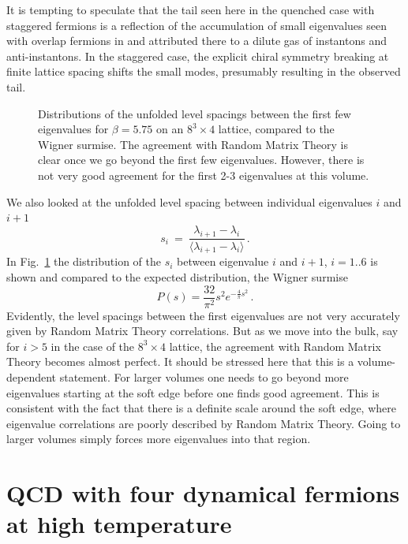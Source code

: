 \documentclass[11pt]{article}
\newcommand{\beq}{\begin{equation}}
\newcommand{\eeq}{\end{equation}}
\newcommand{\noi}{\vspace{12pt}\noindent}
\begin{document}
\noi
It is tempting to speculate that the tail seen here in the quenched case
with staggered fermions is a reflection of the accumulation of small
eigenvalues seen with overlap fermions in \cite{EHKN_fT} and attributed
there to a dilute gas of instantons and anti-instantons. In the staggered
case, the explicit chiral symmetry breaking at finite lattice spacing
shifts the small modes, presumably resulting in the observed tail.

\begin{figure}
\begin{center}
\textwidth
{}
\end{center}
\vspace*{-2mm}
\caption{Distributions of the unfolded level spacings between the
first few eigenvalues for $\beta=5.75$ on an $8^3\times 4$ lattice,
compared to the Wigner surmise.
The agreement with Random Matrix Theory is clear once we go beyond
the first few eigenvalues. However, there is not very good agreement
for the first 2-3 eigenvalues at this volume. }
\label{fig:q_level_space}
\end{figure}

\noi
We also looked at the unfolded level spacing between 
individual eigenvalues $i$ and $i+1$
\beq
s_i~=~\frac{\lambda_{i+1}-\lambda_i}{\langle\lambda_{i+1}-\lambda_i\rangle}\,.
\label{eq:level_space}
\eeq
In Fig.~\ref{fig:q_level_space} the distribution of the $s_i$ between 
eigenvalue $i$ and $i+1$, $i=1..6$ is shown and compared to the expected 
distribution, the Wigner surmise
\beq
P(s) = \frac{32}{\pi^2}s^2e^{-\frac{4}{\pi}s^2}\,.
\eeq
Evidently, the level spacings between the first eigenvalues are not very 
accurately given by Random Matrix Theory correlations. 
But as we move into the bulk, say for $i>5$ in the case of the $8^3\times 4$
lattice, the agreement with Random Matrix Theory becomes almost perfect.
It should be stressed here that this is a volume-dependent statement.
For larger volumes one needs to go beyond more eigenvalues starting at
the soft edge before one finds good agreement. This is consistent with the
fact that there is a definite scale around the soft edge, where eigenvalue
correlations are poorly described by Random Matrix Theory. Going to larger
volumes simply forces more eigenvalues into that region.

\section {QCD with four dynamical fermions at high temperature}
\label{dynamical}
\end{document}
